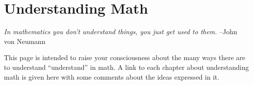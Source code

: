\section{Understanding Math}
\textit{In mathematics you don’t understand things, you just get used to them.}
–John von Neumann

This page is intended to raise your consciousness about the many ways there are
to understand “understand” in math. A link to each chapter about understanding
math is given here with some comments about the ideas expressed in it.
